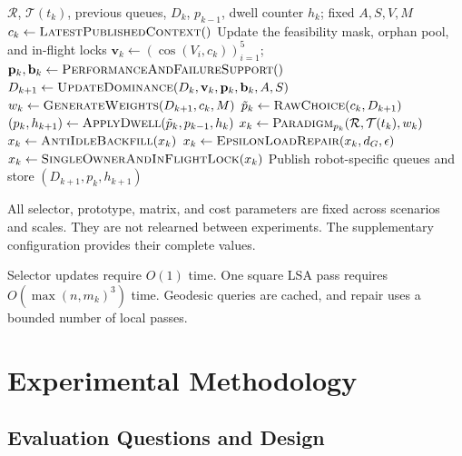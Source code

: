 \documentclass[10pt,letterpaper,onecolumn]{IEEEtran}
\begin{document}
\begin{algorithm}[t]
\caption{AHE-MRTA Event Cycle}
\label{alg:ahe}
\begin{algorithmic}[1]
\REQUIRE $\mathcal R$, $\mathcal T(t_k)$, previous queues, $D_k$,
         $p_{k-1}$, dwell counter $h_k$; fixed $A,S,V,M$
\STATE $c_k\gets\textsc{LatestPublishedContext}()$
\STATE Update the feasibility mask, orphan pool, and in-flight locks
\STATE $\mathbf v_k\gets(\cos(V_i,c_k))_{i=1}^{5}$;
       $\mathbf p_k,\mathbf b_k\gets\textsc{PerformanceAndFailureSupport}()$
\STATE $D_{k+1}\gets\textsc{UpdateDominance}(D_k,\mathbf v_k,
       \mathbf p_k,\mathbf b_k,A,S)$ \hfill {}
\STATE $w_k\gets\textsc{GenerateWeights}(D_{k+1},c_k,M)$
       \hfill {}
\STATE $\tilde p_k\gets\textsc{RawChoice}(c_k,D_{k+1})$
       \hfill {}
\STATE $(p_k,h_{k+1})\gets\textsc{ApplyDwell}(\tilde p_k,p_{k-1},h_k)$
\STATE $x_k\gets\textsc{Paradigm}_{p_k}(\mathcal R,\mathcal T(t_k),w_k)$
       \hfill {}
\STATE $x_k\gets\textsc{AntiIdleBackfill}(x_k)$
  \STATE $x_k\gets\textsc{EpsilonLoadRepair}(x_k,d_G,\epsilon)$
\ENDIF
\STATE $x_k\gets\textsc{SingleOwnerAndInFlightLock}(x_k)$
\STATE Publish robot-specific queues and store $(D_{k+1},p_k,h_{k+1})$
\end{algorithmic}
\end{algorithm}

\label{sec:method-config}

All selector, prototype, matrix, and cost parameters are fixed across scenarios
and scales. They are not relearned between experiments. The supplementary
configuration provides their complete values.

Selector updates require $O(1)$ time. One square LSA pass requires
$O(\max(n,m_k)^3)$ time. Geodesic queries are cached, and repair uses a bounded
number of local passes.

\section{Experimental Methodology}
\label{sec:setup}

\subsection{Evaluation Questions and Design}
\label{sec:planes}
\end{document}
